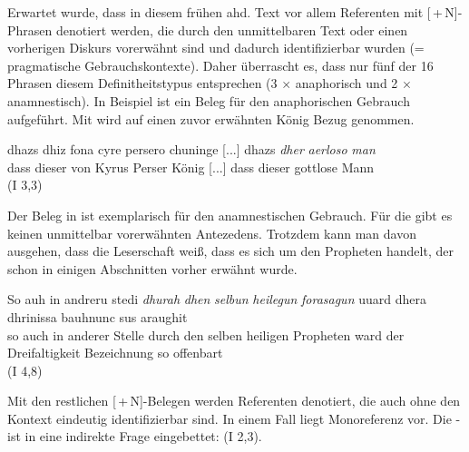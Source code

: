Erwartet wurde, dass in diesem frühen ahd. Text vor allem Referenten mit [\,+\,N]-Phrasen  denotiert werden, die durch den unmittelbaren Text oder einen vorherigen Diskurs vorerwähnt sind und dadurch identifizierbar wurden  (=\,prag\-ma\-tische Gebrauchskontexte). Daher überrascht es, dass nur fünf der 16 Phrasen diesem Definitheitstypus entsprechen (3 $\times$ anaphorisch  und 2  $\times$ anamnestisch). In Beispiel  ist ein Beleg für den  anaphorischen Gebrauch  aufgeführt. Mit  wird auf einen  zuvor erwähnten König Bezug genommen.  

%

\begin{exe}
\ex \label{ex:I1051} \gll  dhazs dhiz fona cyre persero chuninge  [...]  dhazs \textit{dher} \textit{aerloso} \textit{man} \\
{dass} {dieser} {von} {Kyrus} {Perser} {König} [...] {dass} {dieser} {gottlose} {Mann} \\
\glt   {} (I 3,3)
\end{exe}

Der Beleg in  ist exemplarisch für den anamnestischen  Gebrauch. Für die   gibt es keinen unmittelbar vorerwähnten Antezedens. Trotzdem kann man davon ausgehen, dass die Leserschaft weiß, dass es sich um den Propheten handelt, der schon in einigen Abschnitten vorher erwähnt wurde.
%

\begin{exe}
\ex \label{ex:I2524} \gll So auh in andreru stedi \textit{dhurah} \textit{dhen} \textit{selbun} \textit{heilegun} \textit{forasagun} uuard dhera dhrinissa bauhnunc sus araughit  \\
{so} {auch} {in} {anderer} {Stelle} {durch} {den} {selben} {heiligen} {Propheten} {ward} {der} {Dreifaltigkeit} {Bezeichnung} {so} {offenbart} \\
\glt   {} (I 4,8)
\end{exe}

Mit den restlichen [\,+\,N]-Belegen werden Referenten denotiert, die auch ohne den Kontext eindeutig identifizierbar sind. In einem Fall liegt Monoreferenz vor. Die - ist in eine indirekte Frage eingebettet:   (I 2,3). 

